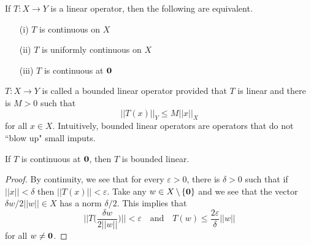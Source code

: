 \vspace{2ex}
\begin{thm}
If $T:X\rightarrow Y$ is a linear operator, then the following are equivalent. 
\begin{itemize}
\item[(i)] $T$ is continuous on $X$
\item[(ii)] $T$ is uniformly continuous on $X$
\item[(iii)] $T$ is continuous at ${\bf 0}$
\end{itemize}
\end{thm}
\vspace{2ex}
\begin{defi}
$T:X\rightarrow Y$ is called a bounded linear operator provided that $T$ is linear and there is $M>0$ such that 
\[||T(x)||_{Y}\leq M||x||_{X}\]
for all $x\in X$. Intuitively, bounded linear operators are operators that do not ``blow up" small imputs.
\end{defi}
\vspace{2ex}
\begin{prop}
If $T$ is continuous at ${\bf 0}$, then $T$ is bounded linear.
\end{prop}
\vspace{2ex}
\begin{proof}
By continuity, we see that for every $\varepsilon >0$, there is $\delta >0$ such that if $||x||<\delta $ then $||T(x)||<\varepsilon $. Take any $w\in X\,\backslash\,\{{\bf 0}\}$ and we see that the vector $\delta w/2||w||\in X$ has a norm $\delta /2$. This implies that
\[||T\Big(\dfrac{\delta w}{2||w||}\Big)||<\varepsilon \quad \mathrm{and}\quad T(w)\leq \dfrac{2\varepsilon }{\delta }||w||\]
for all $w\ne {\bf 0}$. 
\end{proof}
\vspace{2ex}

